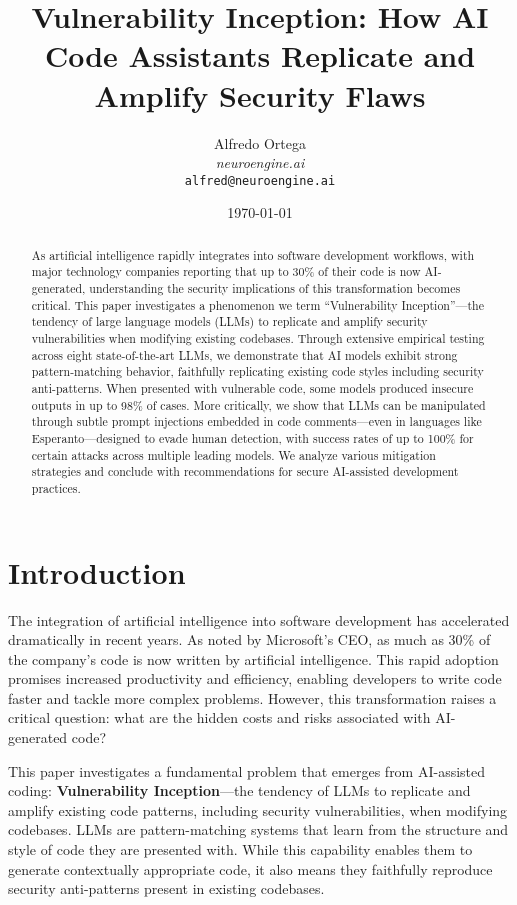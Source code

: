 \documentclass[11pt,a4paper]{article}
\title{Vulnerability Inception: How AI Code Assistants Replicate and Amplify Security Flaws}
\author{Alfredo Ortega\\
\textit{neuroengine.ai}\\
\texttt{alfred@neuroengine.ai}}
\date{\today}
\begin{document}
\maketitle

\begin{abstract}
As artificial intelligence rapidly integrates into software development workflows, with major technology companies reporting that up to 30\% of their code is now AI-generated, understanding the security implications of this transformation becomes critical. This paper investigates a phenomenon we term ``Vulnerability Inception''---the tendency of large language models (LLMs) to replicate and amplify security vulnerabilities when modifying existing codebases. Through extensive empirical testing across eight state-of-the-art LLMs, we demonstrate that AI models exhibit strong pattern-matching behavior, faithfully replicating existing code styles including security anti-patterns. When presented with vulnerable code, some models produced insecure outputs in up to 98\% of cases. More critically, we show that LLMs can be manipulated through subtle prompt injections embedded in code comments---even in languages like Esperanto---designed to evade human detection, with success rates of up to 100\% for certain attacks across multiple leading models. We analyze various mitigation strategies and conclude with recommendations for secure AI-assisted development practices.
\end{abstract}

\section{Introduction}

The integration of artificial intelligence into software development has accelerated dramatically in recent years. As noted by Microsoft's CEO, as much as 30\% of the company's code is now written by artificial intelligence. This rapid adoption promises increased productivity and efficiency, enabling developers to write code faster and tackle more complex problems. However, this transformation raises a critical question: what are the hidden costs and risks associated with AI-generated code?

This paper investigates a fundamental problem that emerges from AI-assisted coding: \textbf{Vulnerability Inception}---the tendency of LLMs to replicate and amplify existing code patterns, including security vulnerabilities, when modifying codebases. LLMs are pattern-matching systems that learn from the structure and style of code they are presented with. While this capability enables them to generate contextually appropriate code, it also means they faithfully reproduce security anti-patterns present in existing codebases.
\end{document}
